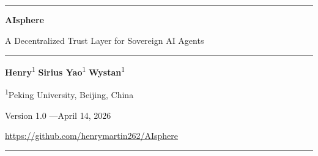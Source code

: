 \documentclass[10pt,a4paper]{article}
\theoremstyle{definition}
\theoremstyle{plain}
\begin{document}
\thispagestyle{empty}
\begin{center}

\vspace*{24pt}

{\color{primary}\rule{\textwidth}{1.5pt}}

\vspace{20pt}

{\fontsize{24}{28}\selectfont\bfseries\color{primary} AIsphere}

\vspace{8pt}

{\fontsize{13}{16}\selectfont\color{darkgray}
A Decentralized Trust Layer for Sovereign AI Agents}

\vspace{16pt}

{\color{primary}\rule{0.35\textwidth}{0.4pt}}

\vspace{16pt}

{\normalsize
\textbf{Henry}\textsuperscript{1} \quad \textbf{Sirius Yao}\textsuperscript{1} \quad \textbf{Wystan}\textsuperscript{1}}

\vspace{4pt}

{\small\color{medgray}
\textsuperscript{1}Peking University, Beijing, China}

\vspace{16pt}

{\small\color{medgray}
Version 1.0 \quad---\quad April 14, 2026}

\vspace{6pt}

{\footnotesize\color{accent}\url{https://github.com/henrymartin262/AIsphere}}

\vspace{24pt}

{\color{primary}\rule{\textwidth}{1.5pt}}

\end{center}

\vspace{16pt}
\end{document}

